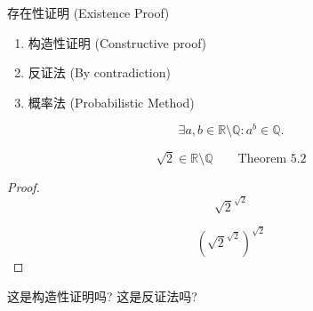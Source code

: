 \begin{frame}{}
  \begin{exampleblock}{存在性证明 (Existence Proof)}
    \begin{enumerate}
      \item 构造性证明 (Constructive proof)
      \item 反证法 (By contradiction)
      \item 概率法 (Probabilistic Method)
    \end{enumerate}
  \end{exampleblock}
\end{frame}

\begin{frame}{}
  \begin{theorem}
    \[
      \exists a, b \in \mathbb{R} \setminus \mathbb{Q}: a^{b} \in \mathbb{Q}.
    \]
  \end{theorem}

  \pause
  \[
    \sqrt{2} \in \mathbb{R} \setminus \mathbb{Q} \qquad \text{Theorem 5.2}
  \]

  \pause
  \begin{proof}
    \[
      \sqrt{2}^{\sqrt{2}}
    \]

    \pause
    \[
      (\sqrt{2}^{\sqrt{2}})^{\sqrt{2}}
    \]
  \end{proof}

  \vspace{0.80cm}
  \pause
  \centerline{ 这是构造性证明吗? 这是反证法吗?}
\end{frame}

